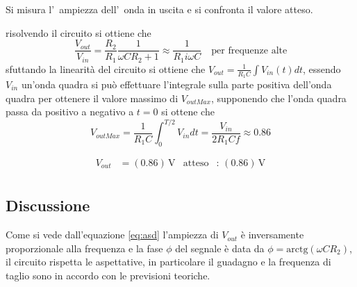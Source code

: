 \documentclass[10pt,a4paper]{article}
\begin{document}
Si misura l'~ampiezza dell'~onda  in uscita e si confronta il valore atteso.\newline

risolvendo  il circuito si ottiene che
\[
	\frac{V_{out}}{V_{in}}=\frac{R_2}{R_1}\frac{1}{\omega C R_2 +1}\approx \frac{1}{R_1i\omega C}\quad \textrm{per frequenze alte}
\]
sfuttando la linearità del circuito si ottiene che $V_{out}=\frac{1}{R_1C}\int V_{in}(t)dt$, essendo $V_{in}$ un'onda quadra si può effettuare l'integrale sulla parte positiva dell'onda quadra per ottenere il valore massimo di $V_{outMax}$, supponendo che l'onda quadra passa da positivo a negativo a $t=0$ si ottene che
\begin{equation}
\label{eq:asd}
	V_{outMax}=\frac{1}{R_1C}\int_0^{T/2}V_{in}dt=\frac{V_{in}}{2R_1Cf}\approx 0.86
\end{equation}

\begin{align*}
V_{out} &= (0.86 )\,\mathrm{V} & \mathrm{atteso} &:\,(0.86  )\, \mathrm{V}  \\
\end{align*}


\subsection{Discussione}
Come si vede dall'equazione \ref{eq:asd} l'ampiezza di $V_{out}$ è inversamente proporzionale alla frequenza e la fase $\phi$ del segnale è data da $\phi=\textrm{arctg}(\omega C R_2)$, il circuito rispetta le aspettative, in particolare il guadagno e la frequenza di taglio sono in accordo con le previsioni teoriche.\newline


\end{document}

